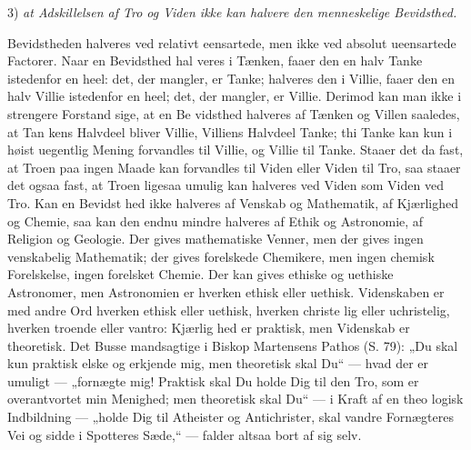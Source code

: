 \documentclass[12pt]{book}
\newcommand{\opage}[1]{\marginnote{\footnotesize\textit{[#1]}}}
\begin{document}
3) \emph{at Adskillelsen af Tro og Viden ikke kan
halvere den menneskelige Bevidsthed.}

Bevidstheden halveres ved relativt eensartede, men ikke
ved absolut ueensartede Factorer. Naar en Bevidsthed hal\-%
\opage{36}\setcounter{footnote}{0}%
veres i Tænken, faaer den en halv Tanke istedenfor en heel:
det, der mangler, er Tanke; halveres den i Villie, faaer den
en halv Villie istedenfor en heel; det, der mangler, er Villie.
Derimod kan man ikke i strengere Forstand sige, at en Be\-%
vidsthed halveres af Tænken og Villen saaledes, at Tan\-%
kens Halvdeel bliver Villie, Villiens Halvdeel Tanke; thi
Tanke kan kun i høist uegentlig Mening forvandles til
Villie, og Villie til Tanke. Staaer det da fast, at Troen
paa ingen Maade kan forvandles til Viden eller Viden til
Tro, saa staaer det ogsaa fast, at Troen ligesaa umulig kan
halveres ved Viden som Viden ved Tro. Kan en Bevidst\-%
hed ikke halveres af Venskab og Mathematik, af Kjærlighed
og Chemie, saa kan den endnu mindre halveres af Ethik og
Astronomie, af Religion og Geologie. Der gives mathematiske
Venner, men der gives ingen venskabelig Mathematik; der
gives forelskede Chemikere, men ingen chemisk Forelskelse, ingen
forelsket Chemie. Der kan gives ethiske og uethiske Astronomer,
men Astronomien er hverken ethisk eller uethisk. Videnskaben
er med andre Ord hverken ethisk eller uethisk, hverken christe\-%
lig eller uchristelig, hverken troende eller vantro: Kjærlig\-%
hed er praktisk, men Videnskab er theoretisk. Det Busse\-%
mandsagtige i Biskop Martensens Pathos (S. 79): „Du
skal kun praktisk elske og erkjende mig, men theoretisk skal
Du“ --- hvad der er umuligt --- „fornægte mig! Praktisk
skal Du holde Dig til den Tro, som er overantvortet min
Menighed; men theoretisk skal Du“ --- i Kraft af en theo\-%
logisk Indbildning --- „holde Dig til Atheister og Antichrister,
skal vandre Fornægteres Vei og sidde i Spotteres Sæde,“ ---
falder altsaa bort af sig selv.
\end{document}
